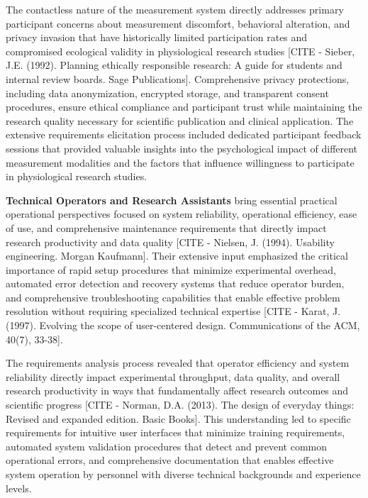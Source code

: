 \documentclass[12pt,a4paper]{article}
\begin{document}
The contactless nature of the measurement system directly addresses primary participant concerns about measurement
discomfort, behavioral alteration, and privacy invasion that have historically limited participation rates and
compromised ecological validity in physiological research
studies [CITE - Sieber, J.E. (1992). Planning ethically responsible research: A guide for students and internal review boards. Sage Publications].
Comprehensive privacy protections, including data anonymization, encrypted storage, and transparent consent procedures,
ensure ethical compliance and participant trust while maintaining the research quality necessary for scientific
publication and clinical application. The extensive requirements elicitation process included dedicated participant
feedback sessions that provided valuable insights into the psychological impact of different measurement modalities and
the factors that influence willingness to participate in physiological research studies.

\textbf{Technical Operators and Research Assistants} bring essential practical operational perspectives focused on system
reliability, operational efficiency, ease of use, and comprehensive maintenance requirements that directly impact
research productivity and data quality [CITE - Nielsen, J. (1994). Usability engineering. Morgan Kaufmann]. Their
extensive input emphasized the critical importance of rapid setup procedures that minimize experimental overhead,
automated error detection and recovery systems that reduce operator burden, and comprehensive troubleshooting
capabilities that enable effective problem resolution without requiring specialized technical
expertise [CITE - Karat, J. (1997). Evolving the scope of user-centered design. Communications of the ACM, 40(7), 33-38].

The requirements analysis process revealed that operator efficiency and system reliability directly impact experimental
throughput, data quality, and overall research productivity in ways that fundamentally affect research outcomes and
scientific
progress [CITE - Norman, D.A. (2013). The design of everyday things: Revised and expanded edition. Basic Books]. This
understanding led to specific requirements for intuitive user interfaces that minimize training requirements, automated
system validation procedures that detect and prevent common operational errors, and comprehensive documentation that
enables effective system operation by personnel with diverse technical backgrounds and experience levels.
\end{document}
